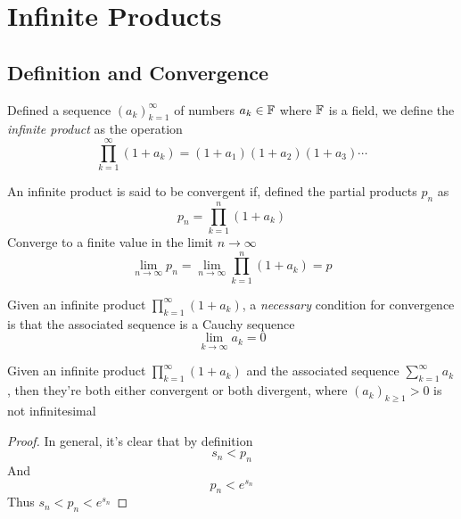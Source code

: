 \documentclass[../complete.tex]{subfiles}
\begin{document}
\section{Infinite Products}
\subsection{Definition and Convergence}
\begin{dfn}
	Defined a sequence $\left(a_k \right)_{k=1}^{\infty}$ of numbers $a_k\in\mathbb{F}$ where $\mathbb{F}$ is a field, we define the \textit{infinite product} as the operation
	\begin{equation}
		\prod_{k=1}^{\infty}\left( 1+a_k \right)=\left( 1+a_1 \right)\left( 1+a_2 \right)(1+a_3)\cdots
		\label{eq:infprod}
	\end{equation}
\end{dfn}
\begin{dfn}
	An infinite product is said to be convergent if, defined the partial products $p_n$ as
	\begin{equation}
		p_n=\prod_{k=1}^{n}\left( 1+a_k \right)
		\label{eq:partialprod}
	\end{equation}
	Converge to a finite value in the limit $n\to\infty$
	\begin{equation}
		\lim_{n\to\infty}p_n=\lim_{n\to\infty}\prod_{k=1}^{n}\left( 1+a_k \right)=p
		\label{eq:convinfprod}
	\end{equation}
\end{dfn}
\begin{lem}
	Given an infinite product $\prod_{k=1}^{\infty}\left( 1+a_k \right)$, a \textit{necessary} condition for convergence is that the associated sequence is a Cauchy sequence
	\begin{equation*}
		\lim_{k\to\infty}a_k=0
	\end{equation*}
\end{lem}
\begin{thm}
	Given an infinite product $\prod_{k=1}^{\infty}\left( 1+a_k \right)$ and the associated sequence $\sum_{k=1}^{\infty}a_k$, then they're both either convergent or both divergent, where $(a_k)_{k\ge1}>0$ is not infinitesimal
\end{thm}
\begin{proof}
	In general, it's clear that by definition
	\begin{equation*}
		s_n<p_n
	\end{equation*}
	And
	\begin{equation*}
		p_n<e^{s_n}
	\end{equation*}
	Thus $s_n<p_n<e^{s_n}$
\end{proof}
\end{document}

